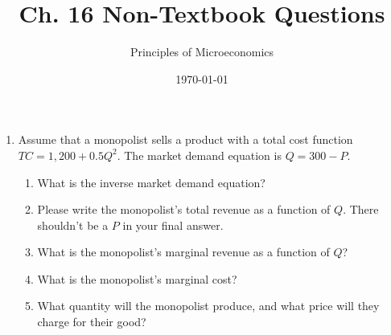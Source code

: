 \documentclass{article}
\title{Ch. 16 Non-Textbook Questions}
\author{Principles of Microeconomics}
\date{\today}
\begin{document}
\maketitle

\begin{enumerate}

\item Assume that a monopolist sells a product with a total cost function $TC = 1{,}200 + 0.5Q^2$. The market demand equation is $Q = 300 - P$.
	\begin{enumerate}
	
	\item What is the inverse market demand equation?
	
	\item Please write the monopolist's total revenue as a function of $Q$. There shouldn't be a $P$ in your final answer.
	
	\item What is the monopolist's marginal revenue as a function of $Q$?
	
	\item What is the monopolist's marginal cost?
	
	\item What quantity will the monopolist produce, and what price will they charge for their good?
	
	\end{enumerate}

\end{enumerate}
\end{document}
